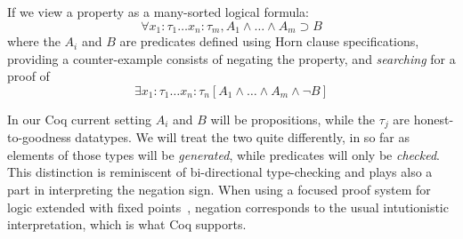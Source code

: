 
If we view  a property as a many-sorted logical formula:
\[
  \forall x_1 \colon \tau_1\dots x_n \colon \tau_m, A_1\land\dots\land A_m \supset B\tag{*}\label{eq:prop}
  \]
  where the $A_i$ and $B$ are  predicates defined
using Horn clause specifications, providing a counter-example
consists of  negating the property, and \emph{searching} for a proof of
\[
  \exists x_1 \colon \tau_1\dots x_n \colon \tau_n [A_1\land\dots\land A_m\wedge \neg B]
  \tag{**}\label{eq:full}
\]

In our Coq current setting $A_i$ and $B$ will be 
propositions, while the $\tau_j$ are honest-to-goodness datatypes. We
will treat the two quite differently, in so far as elements of those
types will be \emph{generated}, while predicates will only be
\emph{checked}. This distinction is reminiscent of bi-directional
type-checking and  plays also a part in interpreting the
negation sign.
%
When using a focused proof system for logic extended with fixed
points~\cite{baelde12tocl}, negation corresponds to the usual
intutionistic interpretation, which is  what Coq supports.  %

